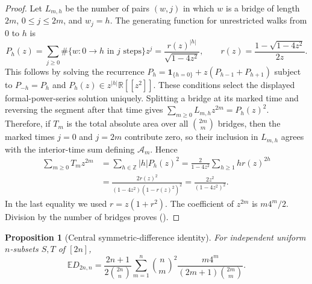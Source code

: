 \documentclass[twoside,10pt]{article}
\numberwithin{equation}{section}
\theoremstyle{slbody}
\newtheorem{proposition}[theorem]{Proposition}
\theoremstyle{definition}
\theoremstyle{remark}
\newcommand{\E}{\mathbb{E}}
\newcommand{\1}{\mathbf{1}}
\renewcommand{\eqref}[1]{%
  \textup{{\normalfont(\oldstylenums{\ref{#1}}}\normalfont)}}
\begin{document}
\begin{proof}
Let $L_{m,h}$ be the number of pairs $(w,j)$ in which $w$ is a bridge of
length $2m$, $0\leq j\leq2m$, and $w_j=h$.  The generating function for
unrestricted walks from $0$ to $h$ is
\[
 P_h(z)=\sum_{j\geq0}\#\{w:0\to h\text{ in }j\text{ steps}\}z^j
 =\frac{r(z)^{|h|}}{\sqrt{1-4z^2}},
 \qquad
 r(z)=\frac{1-\sqrt{1-4z^2}}{2z}.
\]
This follows by solving the recurrence
$P_h=\1_{\{h=0\}}+z(P_{h-1}+P_{h+1})$ subject to
$P_{-h}=P_h$ and $P_h(z)\in z^{|h|}\mathbb R[[z^2]]$.  These conditions select
the displayed formal-power-series solution uniquely.  Splitting a bridge at
its marked time and reversing the segment
after that time gives
$\sum_{m\geq0}L_{m,h}z^{2m}=P_h(z)^2$.  Therefore, if $T_m$ is the total
absolute area over all $\binom{2m}{m}$ bridges, then
the marked times $j=0$ and $j=2m$ contribute zero, so their inclusion in
$L_{m,h}$ agrees with the interior-time sum defining $\mathcal A_m$.  Hence
\begin{align*}
 \sum_{m\geq0}T_mz^{2m}
 &=\sum_{h\in\mathbb Z}|h|P_h(z)^2
 =\frac{2}{1-4z^2}\sum_{h\geq1}h r(z)^{2h}\\
 &=\frac{2r(z)^2}{(1-4z^2)(1-r(z)^2)^2}
 =\frac{2z^2}{(1-4z^2)^2}.
\end{align*}
In the last equality we used $r=z(1+r^2)$.  The coefficient of $z^{2m}$
is $m4^m/2$.  Division by the number of bridges proves
\eqref{eq:discrete-bridge-area}.
\end{proof}

\begin{proposition}[Central symmetric-difference identity]\label{prop:central-exact}
For independent uniform $n$-subsets $S,T$ of $[2n]$,
\begin{equation}\label{eq:central-exact}
 \E D_{2n,n}
 =\frac{2n+1}{2\binom{2n}{n}}
 \sum_{m=1}^n
 \binom{n}{m}^2
 \frac{m4^m}{(2m+1)\binom{2m}{m}}.
\end{equation}
\end{proposition}
\end{document}

